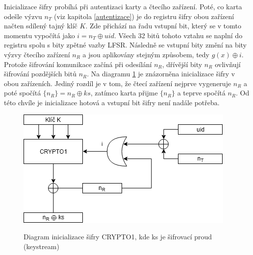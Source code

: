 \par
Inicializace šifry probíhá při autentizaci karty a čtecího zařízení. Poté, co karta odešle výzvu $n_T$ (viz kapitola \ref{autentizace}) je do registru šifry obou zařízení načten sdílený tajný klíč $K$. Zde přichází na řadu vstupní bit, který se v tomto momentu vypočítá jako $i = n_T \oplus {uid}$. Všech 32 bitů tohoto vztahu se naplní do registru spolu s bity zpětné vazby LFSR. Následně se vstupní bity změní na bity výzvy čtecího zařízení $n_R$ a jsou aplikovány stejným způsobem, tedy $g(x) \oplus i$. Protože šifrování komunikace začíná při odesílání $n_R$, dřívější bity $n_R$ ovlivňují šifrování pozdějších bitů $n_R$. Na diagramu \ref{obrazekInicializaceSifry} je znázorněna inicializace šifry v obou zařízeních. Jediný rozdíl je v tom, že čtecí zařízení nejprve vygeneruje $n_R$ a poté spočítá ${\{n_R\} = n_R \oplus ks}$, zatímco karta přijme $\{n_R\}$ a teprve spočítá $n_R$. Od této chvíle je inicializace hotová a vstupní bit šifry není nadále potřeba\cite{Dismantling_Mifare_Classic}.

\begin{figure}[ht]\centering
  \centering
  \includegraphics[width=0.7\linewidth]{obrazky-figures/cryptoInitialization.png}\\[1pt]  
  \caption{Diagram inicializace šifry CRYPTO1, kde ks je šifrovací proud (keystream)\cite{Dismantling_Mifare_Classic}}    
  \label{obrazekInicializaceSifry}
\end{figure}

